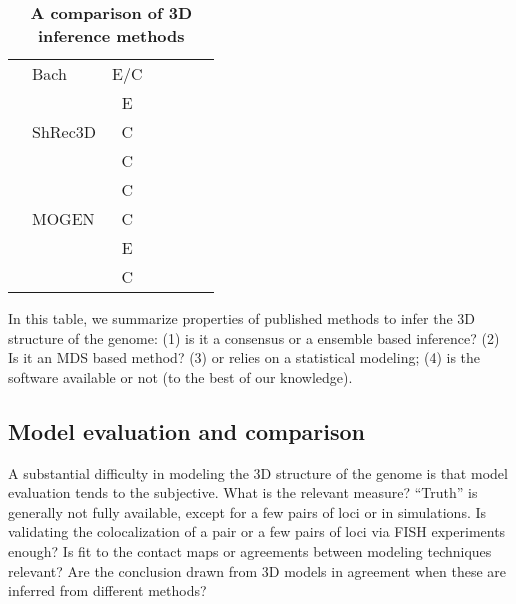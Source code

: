 \documentclass[2columns]{article}
\newcommand*\CHECK{\ding{51}}
\begin{document}
\begin{table}[ht!]
\begin{center}
\begin{tabular}{rlccccc}
\scriptsize{\cite{hu:bayesian}} & Bach & E/C &  & \CHECK & \CHECK\\
\scriptsize{\cite{kalhor:genome}} & & E &   & &\\
\scriptsize{\cite{lesne:3d}} & ShRec3D & C  & \CHECK & & \CHECK \\
\scriptsize{\cite{trieu:large}} & & C & & & \\
\scriptsize{\cite{trieu:3D}} & & C & &  & \\
\scriptsize{\cite{trieu:MOGEN}} & MOGEN & C & & & \\
\scriptsize{\cite{nagano:single-cell}} & & E & & & \\
\scriptsize{\cite{paulsen:manifold}} & & C & \CHECK & & \CHECK \\
\hline
\end{tabular}
\end{center}
\caption{\bf A comparison of 3D inference methods}{\small In this table, we summarize
properties of published methods to infer the 3D structure of the genome: (1)
is it a consensus or a ensemble based inference? (2) Is it an MDS based
method? (3) or relies on a statistical modeling; (4) is the software
available or not (to the best of our knowledge).}
\end{table}

\subsection*{Model evaluation and comparison}

A substantial difficulty in modeling the 3D structure of the genome is that
model evaluation tends to the subjective. What is the relevant measure?
``Truth'' is generally not fully available, except for a few pairs of loci or
in simulations. Is validating the colocalization of a pair or a few pairs of
loci via FISH experiments enough? Is fit to the contact maps or agreements
between modeling techniques relevant? Are the conclusion drawn from 3D models
in agreement when these are inferred from different methods?
\end{document}
